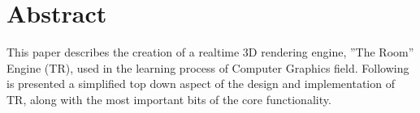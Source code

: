 \section{Abstract}

This paper describes the creation of a realtime 3D rendering engine, ''The Room'' Engine (TR),
used in the learning process of Computer Graphics field. Following is presented a simplified
top down aspect of the design and implementation of TR, along with the most important bits of
the core functionality.
